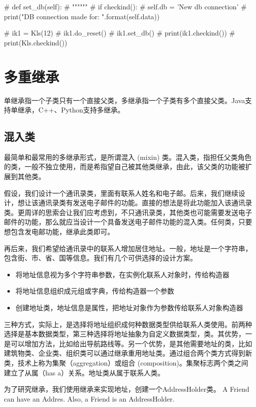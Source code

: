 \begin{python}
\begin{python}
#     def set_db(self):
#         """"""
#         if checkind():
#             self.db = 'New db connection'
#             print("DB connection made for: {}".format(self.data))

# ik1 = Kls(12)
# ik1.do_reset()
# ik1.set_db()
# print(ik1.checkind())
# print(Kls.checkind())
\end{python}

\section{多重继承}
单继承指一个子类只有一个直接父类，多继承指一个子类有多个直接父类。Java支持单继承，C++、Python支持多继承。
\subsection{混入类}
最简单和最常用的多继承形式，是所谓混入 (mixin) 类。混入类，指担任父类角色的类，一般不独立使用，而是希指望自己被其他类继承，由此，该父类的功能被扩展到其他类。

假设，我们设计一个通讯录类，里面有联系人姓名和电子邮。后来，我们继续设计，想让该通讯录类有发送电子邮件的功能。直接的想法是将此功能加入该通讯录类。更周详的思索会让我们应考虑到，不只通讯录类，其他类也可能需要发送电子邮件的功能，那么就应当设计一个具备发送电子邮件功能的混入类。任何类，只要想包含发电邮功能，继承此类即可。

再后来，我们希望给通讯录中的联系人增加居住地址。一般，地址是一个字符串，包含街、市、省、国等信息。我们有几个可供选择的设计方案。
\begin{itemize}
\item 将地址信息视为多个字符串参数，在实例化联系人对象时，传给构造器
\item 将地址信息组织成元组或字典，传给构造器一个参数
\item 创建地址类，地址信息是属性，把地址对象作为参数传给联系人对象构造器
\end{itemize}
三种方式，实际上，是选择将地址组织成何种数据类型供给联系人类使用。前两种选择是基本数据类型，第三种选择将地址抽象为自定义数据类型，类。其优势，一是可以增加方法，比如给出导航路线等。另一个优势，是其他需要地址的类，比如建筑物类、企业类、组织类可以通过继承重用地址类。通过组合两个类方式得到新类，技术上称为集聚（aggregation）或组合 (composition)。集聚标志两个类之间建立了从属（has a）关系。地址类从属于联系人类。

为了研究继承，我们使用继承来实现地址，创建一个AddressHolder类。
A Friend can have an Addres. Also, a Friend is an AddressHolder.


\end{python}
